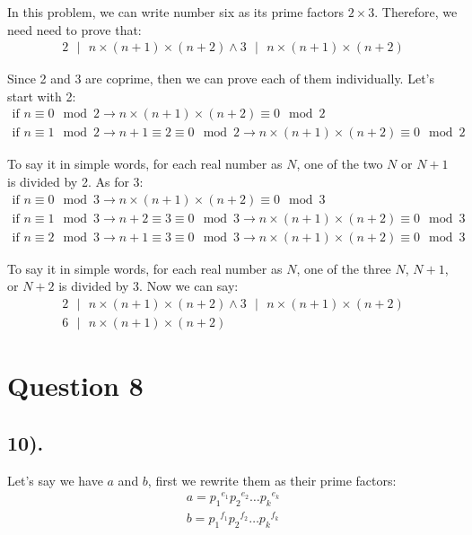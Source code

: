 \documentclass[12pt]{article}
\begin{document}
In this problem, we can write number six as its prime factors $2 \times 3$. Therefore, we need need to prove that:
\begin{gather*}
    2 \text{ $|$ } n \times (n+1) \times (n+2) \wedge 3 \text{ $|$ } n \times (n+1) \times (n+2)
\end{gather*}

Since 2 and 3 are coprime, then we can prove each of them individually. Let's start with 2:
\begin{gather*}
    \text{if } n \equiv 0 \mod 2 \to n \times (n+1) \times (n+2) \equiv 0 \mod 2 \\
    \text{if } n \equiv 1 \mod 2 \to n+1 \equiv 2 \equiv 0 \mod 2 \to n \times (n+1) \times (n+2) \equiv 0 \mod 2
\end{gather*}

To say it in simple words, for each real number as $N$, one of the two $N$ or $N+1$ is divided by 2. As for 3:
\begin{gather*}
    \text{if } n \equiv 0 \mod 3 \to n \times (n+1) \times (n+2) \equiv 0 \mod 3 \\
    \text{if } n \equiv 1 \mod 3 \to n+2 \equiv 3 \equiv 0 \mod 3 \to n \times (n+1) \times (n+2) \equiv 0 \mod 3 \\
    \text{if } n \equiv 2 \mod 3 \to n+1 \equiv 3 \equiv 0 \mod 3 \to n \times (n+1) \times (n+2) \equiv 0 \mod 3
\end{gather*}

To say it in simple words, for each real number as $N$, one of the three $N$, $N+1$, or $N+2$ is divided by 3. Now we can say:
\begin{gather*}
    2 \text{ $|$ } n \times (n+1) \times (n+2) \wedge 3 \text{ $|$ } n \times (n+1) \times (n+2) \\
    6 \text{ $|$ } n \times (n+1) \times (n+2)
\end{gather*}

\section*{Question 8}
\subsection*{10).}
Let's say we have $a$ and $b$, first we rewrite them as their prime factors:
\begin{gather*}
    a = {p_{1}}^{e_{1}} {p_{2}}^{e_{2}} \ldots {p_{k}}^{e_{k}} \\
    b = {p_{1}}^{f_{1}} {p_{2}}^{f_{2}} \ldots {p_{k}}^{f_{k}}
\end{gather*}
\end{document}
